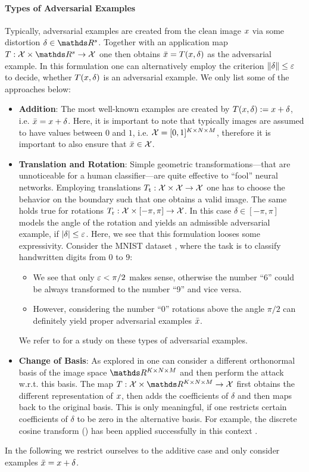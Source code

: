 \paragraph{Types of Adversarial Examples} Typically, adversarial examples are created from the clean image $x$ via some distortion $\delta\in\R^s$. Together with an application map $T:\Inp\times\R^s\to\Inp$ one then obtains $\bar{x}=T(x,\delta)$ as the adversarial example. In this formulation one can alternatively employ the criterion $\left\|\delta\right\|\leq \varepsilon$ to decide, whether $T(x,\delta)$ is an adversarial example. We only list some of the approaches below:
%
\begin{itemize}
\item\textbf{Addition}: The most well-known examples are created by $T(x,\delta):=x+\delta$, i.e. $\bar{x} = x + \delta$. Here, it is important to note that typically images are assumed to have values between $0$ and $1$, i.e. $\mathcal{X}=[0,1]^{K\times N\times M}$, therefore it is important to also ensure that $\bar{x}\in\mathcal{X}$.
%
\item\textbf{Translation and Rotation}: Simple geometric transformations---that are unnoticeable for a human classifier---are quite effective to \enquote{fool} neural networks. Employing translations $T_{\text{t}}:\mathcal{X}\times\mathcal{X}\to\mathcal{X}$ one has to choose the behavior on the boundary such that one obtains a valid image. The same holds true for rotations $T_{\text{r}}:\mathcal{X}\times [-\pi,\pi]\to\mathcal{X}$. In this case $\delta\in[-\pi,\pi]$ models the angle of the rotation and yields an admissible adversarial example, if $\left|\delta\right|\leq \varepsilon$. Here, we see that this formulation looses some expressivity. Consider the MNIST dataset \cite{leCun10}, where the task is to classify handwritten digits from $0$ to $9$:
%
\begin{itemize}
\item We see that only $\varepsilon<\pi/2$ makes sense, otherwise the number \enquote{6} could be always transformed to the number \enquote{9} and vice versa.
\item However, considering the number \enquote{0} rotations above the angle $\pi/2$ can definitely yield proper adversarial examples $\bar{x}$.
\end{itemize}
%
We refer to \cite{engstrom2018rotation} for a study on these types of adversarial examples.
%
\item\textbf{Change of Basis}: As explored in \cite{guo2017countering} one can consider a different orthonormal basis of the image space $\R^{K\times N\times M}$ and then perform the attack w.r.t. this basis. 
The map $T:\Inp\times\R^{K\times N\times M}\to\Inp$ first obtains the different representation of $x$, then adds the coefficients of $\delta$ and then maps back to the original basis. This is only meaningful, if one restricts certain coefficients of $\delta$ to be zero in the alternative basis. For example, the discrete cosine transform (\cite{ahmed1974discrete}) has been applied successfully in this context \cite{guo2017countering}.
\end{itemize}
%
%
In the following we restrict ourselves to the additive case and only consider examples $\bar{x} = x + \delta$.
%
%
